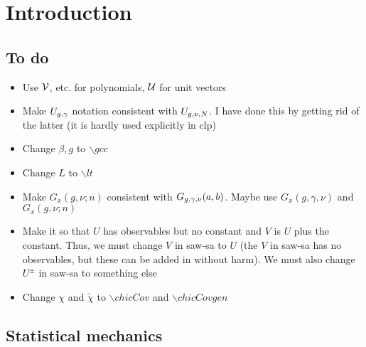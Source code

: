 
\chapter{Introduction}

\section{To do}
\begin{itemize}
\item
Use $\mathcal{V}$, etc. for polynomials, $\mathcal{U}$ for unit vectors

\item
Make $U_{g,\gamma}$ notation consistent with $U_{g,\nu,N}$.
I have done this by getting rid of the latter (it is hardly used
explicitly in clp)

\item
Change $\beta, g$ to $\backslash gcc$

\item
Change $L$ to $\backslash lt$

\item
Make $G_x(g, \nu; n)$ consistent with $G_{g,\gamma,\nu}(a, b)$.
Maybe use $G_x(g, \gamma, \nu)$ and $G_x(g, \nu; n)$

\item
Make it so that $U$ has observables but no constant and $V$ is $U$
plus the constant. Thus, we must change $V$ in saw-sa to $U$ (the $V$
in saw-sa has no observables, but these can be added in without harm).
We must also change $U^\pm$ in saw-sa to something else

\item
Change $\chi$ and $\tilde\chi$ to $\backslash chicCov$ and $\backslash chicCovgen$
\end{itemize}


\section{Statistical mechanics}

